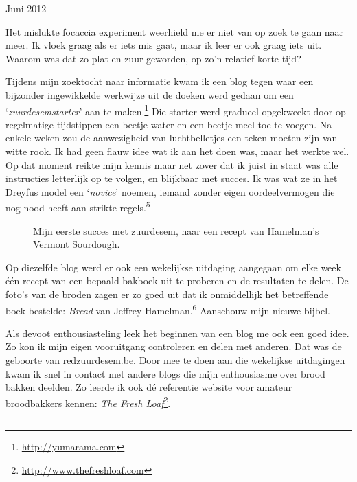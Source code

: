 \documentclass[
  11pt,
  dutch,
]{memoir}
\newcommand{\adjustimg}{%
  \checkoddpage%
  \ifoddpage\hspace*{\dimexpr\evensidemargin-\oddsidemargin}\else\hspace*{-\dimexpr\evensidemargin-\oddsidemargin}\fi%
}
\newcommand{\centerimg}[2][width=\textwidth]{%
  \makebox[\textwidth]{\adjustimg\texttt{[image: \#2]}}%
}
\begin{document}
\begin{flushright}
Juni 2012
\end{flushright}

Het mislukte focaccia experiment weerhield me er niet van op zoek te
gaan naar meer. Ik vloek graag als er iets mis gaat, maar ik leer er ook
graag iets uit. Waarom was dat zo plat en zuur geworden, op zo'n
relatief korte tijd?

Tijdens mijn zoektocht naar informatie kwam ik een blog tegen waar een
bijzonder ingewikkelde werkwijze uit de doeken werd gedaan om een
`\emph{zuurdesemstarter}' aan te maken.\footnote{\url{http://yumarama.com}}
Die starter werd gradueel opgekweekt door op regelmatige tijdstippen een
beetje water en een beetje meel toe te voegen. Na enkele weken zou de
aanwezigheid van luchtbelletjes een teken moeten zijn van witte rook. Ik
had geen flauw idee wat ik aan het doen was, maar het werkte wel. Op dat
moment reikte mijn kennis maar net zover dat ik juist in staat was alle
instructies letterlijk op te volgen, en blijkbaar met succes. Ik was wat
ze in het Dreyfus model een `\emph{novice}' noemen, iemand zonder eigen
oordeelvermogen die nog nood heeft aan strikte
regels.\textsuperscript{5}

\begin{figure}
    \mbox{} \par
    \noindent\centerimg[width=\paperwidth]{img/bw/ietsmeer.JPG}
    \caption[Mijn eerste succes met zuurdesem.]{Mijn eerste succes met zuurdesem, naar een recept van Hamelman's Vermont Sourdough.}
\end{figure}

Op diezelfde blog werd er ook een wekelijkse uitdaging aangegaan om elke
week één recept van een bepaald bakboek uit te proberen en de resultaten
te delen. De foto's van de broden zagen er zo goed uit dat ik
onmiddellijk het betreffende boek bestelde: \emph{Bread} van Jeffrey
Hamelman.\textsuperscript{6} Aanschouw mijn nieuwe bijbel.

Als devoot enthousiasteling leek het beginnen van een blog me ook een
goed idee. Zo kon ik mijn eigen vooruitgang controleren en delen met
anderen. Dat was de geboorte van
\href{https://redzuurdesem.be}{redzuurdesem.be}. Door mee te doen aan
die wekelijkse uitdagingen kwam ik snel in contact met andere blogs die
mijn enthousiasme over brood bakken deelden. Zo leerde ik ook dé
referentie website voor amateur broodbakkers kennen: \emph{The Fresh
Loaf}\footnote{\url{http://www.thefreshloaf.com}}.

\pfbreak
\end{document}
